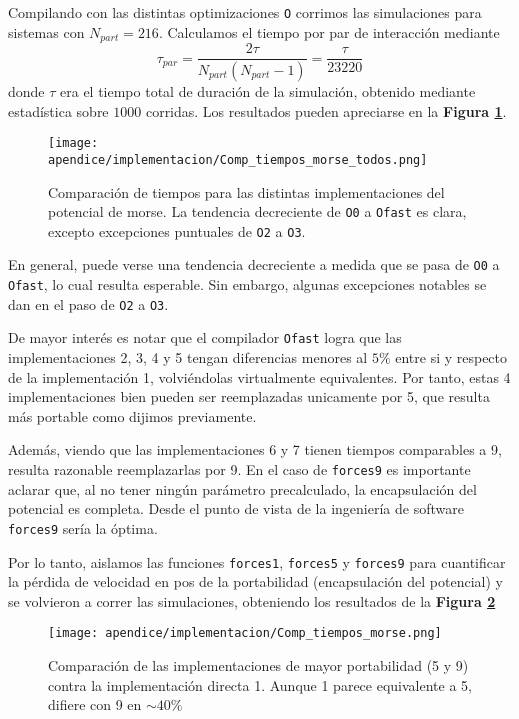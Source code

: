 Compilando con las distintas optimizaciones \texttt{O} corrimos las simulaciones para sistemas con $N_{part}=216$. 
Calculamos el tiempo por par de interacción mediante 
\[ \tau_{par}=\frac{2\tau}{N_{part}(N_{part}-1)} =\frac{\tau}{23220} \]
donde $\tau$ era el tiempo total de duración de la simulación, obtenido mediante estadística sobre $1000$ corridas. 
Los resultados pueden apreciarse en la \textbf{Figura \ref{fig:CompTodas}}.

\begin{figure}[h]
	\centering
	\texttt{[image: apendice/implementacion/Comp\_tiempos\_morse\_todos.png]}
	\caption{Comparación de tiempos para las distintas implementaciones del potencial de morse. 
	La tendencia decreciente de \texttt{O0} a \texttt{Ofast} es clara, excepto excepciones puntuales de \texttt{O2} a \texttt{O3}.}
	\label{fig:CompTodas}
\end{figure}

En general, puede verse una tendencia decreciente a medida que se pasa de \texttt{O0} a \texttt{Ofast}, lo cual resulta esperable. 
Sin embargo, algunas excepciones notables se dan en el paso de \texttt{O2} a \texttt{O3}.

De mayor interés es notar que el compilador \texttt{Ofast} logra que las implementaciones 2, 3, 4 y 5 tengan diferencias menores al $5\%$ entre si y respecto de la implementación 1, 
volviéndolas virtualmente equivalentes.  
Por tanto, estas 4 implementaciones bien pueden ser reemplazadas unicamente por 5, que resulta más portable como dijimos previamente.

Además, viendo que las implementaciones 6 y 7 tienen tiempos comparables a 9, resulta razonable reemplazarlas por 9. 
En el caso de \texttt{forces9} es importante aclarar que, al no tener ningún parámetro precalculado, la encapsulación del potencial es completa. 
Desde el punto de vista de la ingeniería de software \texttt{forces9} sería la óptima. 

Por lo tanto, aislamos las funciones \texttt{forces1}, \texttt{forces5} y \texttt{forces9} para cuantificar la pérdida de velocidad en pos de la portabilidad (encapsulación del potencial) y 
se volvieron a correr las simulaciones, obteniendo los resultados de la \textbf{Figura \ref{fig:CompEsp}}

\begin{figure}[h]
	\centering
	\texttt{[image: apendice/implementacion/Comp\_tiempos\_morse.png]}
	\caption{Comparación de las implementaciones de mayor portabilidad (5 y 9) contra la implementación directa 1. 
	Aunque 1 parece equivalente a 5, difiere con 9 en $\sim 40\%$}
	\label{fig:CompEsp}
\end{figure}

